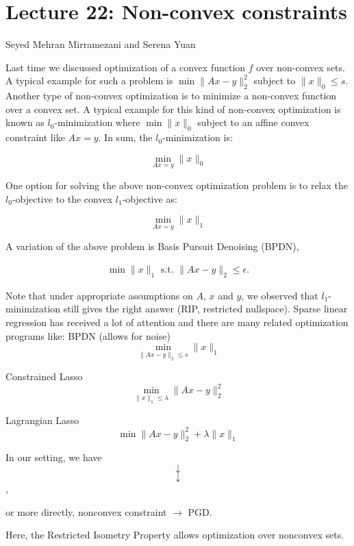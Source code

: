 

\section{Lecture 22: Non-convex constraints} 

\begin{center}
Seyed Mehran Mirramezani and Serena Yuan
\end{center}


Last time we discussed optimization of a convex function $f$ over non-convex sets. A typical example for such a problem is $\min \| Ax-y\|_2^2$ subject to $\|x\|_0 \leq s$. Another type of non-convex optimization is to minimize a non-convex function over a convex set. A typical example for this kind of non-convex optimization is known as $l_0$-minimization where $\min \| x\|_0$ subject to an affine convex constraint like $Ax=y$. In sum, the $l_0$-minimization is: 

$$\min_{Ax=y} \|x\|_0$$

One option for solving the above non-convex optimization problem is to relax the $l_0$-objective to the convex $l_1$-objective as:

$$\min_{Ax=y} \|x\|_1$$

A variation of the above problem is Basis Pursuit Denoising (BPDN),

\begin{align}
\min \|x\|_1 \text{ s.t. } \|Ax - y \|_2 \leq \epsilon.
\end{align}


Note that under appropriate assumptions on $A$, $x$ and $y$, we observed that $l_1$-minimization still gives the right answer (RIP, restricted nullspace).
Sparse linear regression has received a lot of attention and there are many related optimization programs like:
BPDN (allows for noise)
$$\min_{\|Ax-y\|_2 \leq s} \|x\|_1$$

Constrained Lasso
$$\min_{\|x\|_1 \leq \lambda }\|Ax-y\|_2^2 $$

Lagrangian Lasso
$$\min \|Ax-y\|_2^2 +  \lambda \|x\|_1$$

In our setting, we have \\

$$\downarrow$$
$$\downarrow$$
,

or more directly, nonconvex constraint $\rightarrow$ PGD. 

Here, the Restricted Isometry Property allows optimization over nonconvex sets.


